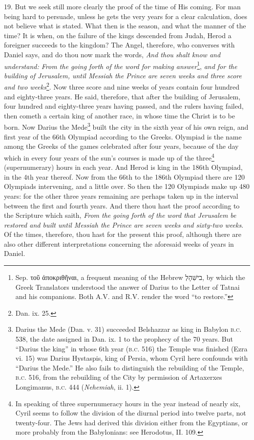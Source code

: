 19. But we seek still more clearly the proof of the time of His coming. For man being hard to persuade, unless he gets the very years for a clear calculation, does not believe what is stated. What then is the season, and what the manner of the time? It is when, on the failure of the kings descended from Judah, Herod a foreigner succeeds to the kingdom? The Angel, therefore, who converses with Daniel says, and do thou now mark the words, \emph{And thou shalt know and understand: From the going forth of the word for making answer}\footnote{Sep. \textgreek{τοῦ ἀποκριθῆναι}, a frequent meaning of the Hebrew \texthebrew{ב\texthebrew{ישִּׁהָלְ}}, by which the Greek Translators understood the answer of Darius to the Letter of Tatnai and his companions. Both A.V. and R.V. render the word “to restore.”}, \emph{and for the building of Jerusalem, until Messiah the Prince are seven weeks and three score and two weeks}\footnote{Dan. ix. 25.}. Now three score and nine weeks of years contain four hundred and eighty-three years. He said, therefore, that after the building of Jerusalem, four hundred and eighty-three years having passed, and the rulers having failed, then cometh a certain king of another race, in whose time the Christ is to be born. Now Darius the Mede\footnote{Darius the Mede (Dan. v. 31) succeeded Belshazzar as king in Babylon \textsc{b.c.} 538, the date assigned in Dan. ix. 1 to the prophecy of the 70 years. But “Darius the king” in whose 6th year (\textsc{b.c.} 516) the Temple was finished (Ezra vi. 15) was Darius Hystaspis, king of Persia, whom Cyril here confounds with “Darius the Mede.” He also fails to distinguish the rebuilding of the Temple, \textsc{b.c.} 516, from the rebuilding of the City by permission of Artaxerxes Longimanus, \textsc{b.c.} 444 (\emph{Nehemiah}, ii. 1).} built the city in the sixth year of his own reign, and first year of the 66th Olympiad according to the Greeks. Olympiad is the name among the Greeks of the games celebrated after four years, because of the day which in every four years of the sun’s courses is made up of the three\footnote{In speaking of three supernumeracy hours in the year instead of nearly six, Cyril seems to follow the division of the diurnal period into twelve parts, not twenty-four. The Jews had derived this division either from the Egyptians, or more probably from the Babylonians: see Herodotus, II. 109.} (supernumerary) hours in each year. And Herod is king in the 186th Olympiad, in the 4th year thereof. Now from the 66th to the 186th Olympiad there are 120 Olympiads intervening, and a little over. So then the 120 Olympiads make up 480 years: for the other three years remaining are perhaps taken up in the interval between the first and fourth years. And there thou hast the proof according to the Scripture which saith, \emph{From the going forth of the word that Jerusalem be restored and built until Messiah the Prince are seven weeks and sixty-two weeks}. Of the times, therefore, thou hast for the present this proof, although there are also other different interpretations concerning the aforesaid weeks of years in Daniel.

